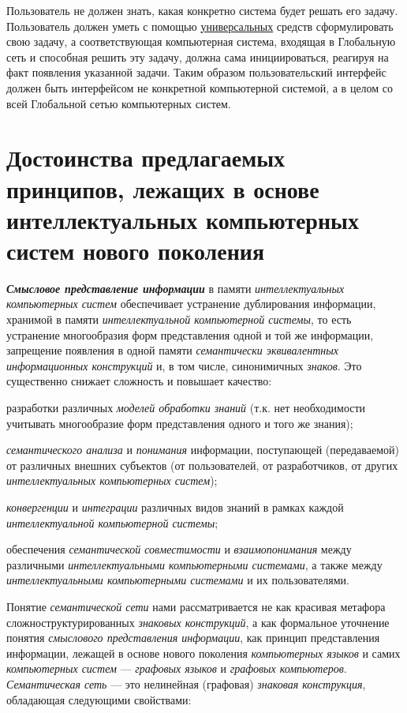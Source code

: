 Пользователь не должен знать, какая конкретно система будет решать его задачу. Пользователь должен уметь с помощью \underline{универсальных} средств сформулировать свою задачу, а соответствующая компьютерная система, входящая в Глобальную сеть и способная решить эту задачу, должна сама инициироваться, реагируя на факт появления указанной задачи. Таким образом пользовательский интерфейс должен быть интерфейсом не конкретной компьютерной системой, а в целом со всей Глобальной сетью компьютерных систем. 

\section{Достоинства предлагаемых принципов, лежащих в основе интеллектуальных компьютерных систем нового поколения}
\label{sec_ngics_advant}

\textbf{\textit{Смысловое представление информации}} в памяти \textit{интеллектуальных компьютерных систем} обеспечивает устранение дублирования информации, хранимой в памяти \textit{интеллектуальной компьютерной системы}, то есть устранение многообразия форм представления одной и той же информации, запрещение появления в одной памяти \textit{семантически эквивалентных информационных конструкций} и, в том числе, синонимичных \textit{знаков}. Это существенно снижает сложность и повышает качество:

\begin{textitemize}
	\item разработки различных \textit{моделей обработки знаний} (т.к. нет необходимости учитывать многообразие форм представления одного и того же знания);
	\item \textit{семантического анализа} и \textit{понимания} информации, поступающей (передаваемой) от различных внешних субъектов (от пользователей, от разработчиков, от других \textit{интеллектуальных компьютерных систем});
	\item \textit{конвергенции} и \textit{интеграции} различных видов знаний в рамках каждой \textit{интеллектуальной компьютерной системы};
	\item обеспечения \textit{семантической совместимости} и \textit{взаимопонимания} между различными \textit{интеллектуальными компьютерными системами}, а также между \textit{интеллектуальными компьютерными системами} и их пользователями.
\end{textitemize}

Понятие \textit{семантической сети} нами рассматривается не как красивая метафора сложноструктурированных \textit{знаковых конструкций}, а как формальное уточнение понятия \textit{смыслового представления информации}, как принцип представления информации, лежащей в основе нового поколения \textit{компьютерных языков} и самих \textit{компьютерных систем} --- \textit{графовых языков} и \textit{графовых компьютеров}. \textit{Семантическая сеть} --- это нелинейная (графовая) \textit{знаковая конструкция}, обладающая следующими свойствами:

